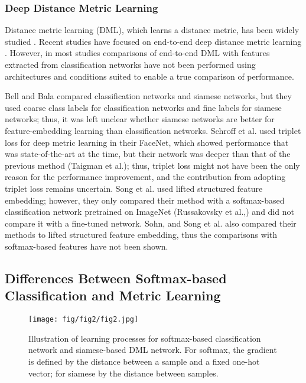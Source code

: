 \documentclass[9pt,technote,compsoc]{./sty/IEEEtran}
\begin{document}
\subsubsection{Deep Distance Metric Learning}
Distance metric learning (DML), which learns a distance metric, has been widely studied
\cite{bromley1994signature}\cite{chopra2005learning}\cite{chechik2010large}\cite{qian2015fine}.
Recent studies have focused on end-to-end deep distance metric learning \cite{bell2015productnet}\cite{schroff2015facenet}\cite{song2016deep}\cite{sohn2016improved}\cite{song2017learnable}.
However, in most studies comparisons of end-to-end DML with features extracted from classification networks have not been performed using architectures and conditions suited to enable a true comparison of performance.

Bell and Bala\cite{bell2015productnet} compared classification
networks and siamese networks, but they used coarse class labels
for classification networks and fine labels for siamese networks;
thus, it was left unclear whether siamese networks are
better for feature-embedding learning than classification networks.
Schroff et al.\cite{schroff2015facenet} used triplet loss for deep metric
learning in their FaceNet, which showed performance that
was state-of-the-art at the time, but their network was deeper
than that of the previous method (Taigman et al.\cite{taigman2014deepface}); thus,
triplet loss might not have been the only reason for the performance
improvement, and the contribution from adopting triplet
loss remains uncertain. Song et al.\cite{song2016deep} used lifted structured
feature embedding; however, they only compared their
method with a softmax-based classification network pretrained
on ImageNet (Russakovsky et al.,\cite{russakovsky2015imagenet}) and
did not compare it with a fine-tuned network.  Sohn\cite{sohn2016improved},
and Song et al.\cite{song2017learnable}
also compared their methods to lifted
structured feature embedding, thus the comparisons with softmax-based
features have not been shown.

\subsection{Differences Between Softmax-based Classification and Metric Learning}
\begin{figure}[t]
	\centering
	\texttt{[image: fig/fig2/fig2.jpg]}
	\caption{Illustration of learning processes for softmax-based classification network and siamese-based DML network. For softmax, the gradient is defined by the distance between a sample and a fixed one-hot vector; for siamese by the distance between samples.}
	\label{fig:softmaxAndDML}
\end{figure}
\end{document}
